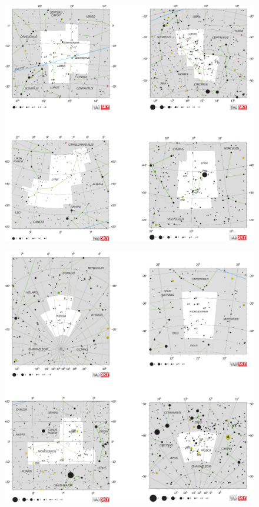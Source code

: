 \documentclass[a4paper,12pt]{extarticle}
\begin{document}
\clearpage
\begin{figure}
	\centering
	\includegraphics[width=\linewidth]{C13.eps}
\end{figure}
\clearpage
\begin{figure}
	\centering
	\includegraphics[width=\linewidth]{C14.eps}
\end{figure}
\end{document}
